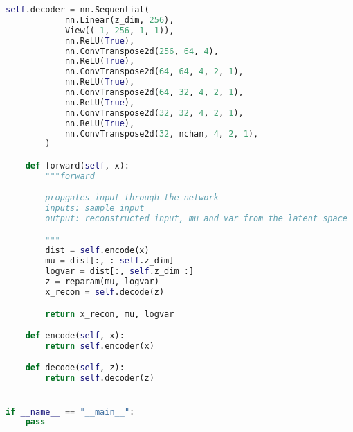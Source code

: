 \documentclass[justified,nobib]{tufte-handout}
\begin{document}
\begin{fullwidth}
\begin{lstlisting}[language=Python]
        self.decoder = nn.Sequential(
            nn.Linear(z_dim, 256),
            View((-1, 256, 1, 1)),
            nn.ReLU(True),
            nn.ConvTranspose2d(256, 64, 4),
            nn.ReLU(True),
            nn.ConvTranspose2d(64, 64, 4, 2, 1),
            nn.ReLU(True),
            nn.ConvTranspose2d(64, 32, 4, 2, 1),
            nn.ReLU(True),
            nn.ConvTranspose2d(32, 32, 4, 2, 1),
            nn.ReLU(True),
            nn.ConvTranspose2d(32, nchan, 4, 2, 1),
        )

    def forward(self, x):
        """forward

        propgates input through the network
        inputs: sample input
        output: reconstructed input, mu and var from the latent space

        """
        dist = self.encode(x)
        mu = dist[:, : self.z_dim]
        logvar = dist[:, self.z_dim :]
        z = reparam(mu, logvar)
        x_recon = self.decode(z)

        return x_recon, mu, logvar

    def encode(self, x):
        return self.encoder(x)

    def decode(self, z):
        return self.decoder(z)


if __name__ == "__main__":
    pass


\end{lstlisting}

\end{fullwidth}
\end{document}
